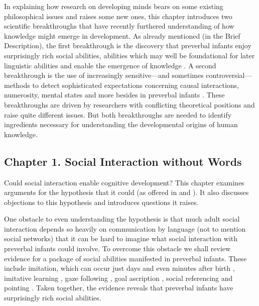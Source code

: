\documentclass[12pt,\papersize]{extarticle}
\begin{document}
In explaining how research on developing minds bears on some existing philosophical issues and raises some new ones,
this chapter introduces two scientific breakthroughs that have recently furthered understanding of how knowledge might emerge in development.
As already mentioned (in the Brief Description), the first breakthrough is the discovery that preverbal infants enjoy surprisingly rich social abilities, abilities which
may well be foundational for later linguistic abilities and enable the emergence of knowledge \citep[e.g.][]{Csibra:2009xr,Meltzoff:2007pj,Tomasello:2005wx}. 
A second breakthrough is the use of increasingly sensitive---and sometimes controversial---methods to detect  sophisticated expectations concerning  causal interactions, numerosity, mental states and more besides in preverbal infants \citep[e.g.][]{Spelke:1990jn,Baillargeon:gx}.
These breakthroughs are driven by researchers with conflicting theoretical positions and raise quite different issues.  
But both breakthroughs are needed to identify ingredients necessary for understanding the developmental origins of human knowledge.



\subsection{Chapter 1. Social Interaction without Words}
Could social interaction enable cognitive development? 
This chapter examines arguments for the hypothesis that it could (as offered in \citealp{Tomasello:2003tq} and \citealp{Moll:2007gu}). 
It also discusses objections to this hypothesis and introduces questions it raises.
 
One obstacle to even understanding the hypothesis is that much adult social interaction depends so heavily on communication by language (not to mention social networks) that it can be hard to imagine what social interaction with preverbal infants could involve.
To overcome this obstacle we shall review evidence for a package of social abilities manifested in preverbal infants.
These include imitation, which can occur just days and even minutes after birth \citep{meltzoff:1977_imitation,field:1982_imitation,meltzoff:1983_newborn}, 
imitative learning \citep{carpenter:1998_fourteen}, 
gaze following \citep{Csibra:2008be},
goal ascription \citep{Gergely:1995sq,Woodward:2000jw},
social referencing \citep{Baldwin:2000qq} 
and 
pointing \citep{Liszkowski:2006ec}.  
Taken together, the evidence reveals that preverbal infants have surprisingly rich social abilities.
\end{document}
